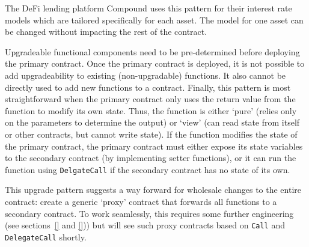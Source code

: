 The DeFi lending platform Compound uses this pattern for their interest rate models which are tailored specifically for each asset. The model for one asset can be changed without impacting the rest of the contract.

Upgradeable functional components need to be pre-determined before deploying the primary contract. Once the primary contract is deployed, it is not possible to add upgradeability to existing (non-upgradable) functions. It also cannot be directly used to add new functions to a contract. Finally, this pattern is most straightforward when the primary contract only uses the return value from the function to modify its own state. Thus, the function is either `pure' (relies only on the parameters to determine the output) or `view' (can read state from itself or other contracts, but cannot write state). If the function modifies the state of the primary contract, the primary contract must either expose its state variables to the secondary contract (by implementing setter functions), or it can run the function using \texttt{DelgateCall} if the secondary contract has no state of its own. 

This upgrade pattern suggests a way forward for wholesale changes to the entire contract: create a generic `proxy' contract that forwards all functions to a secondary contract. To work seamlessly, this requires some further engineering (see sections~\ref{} and \ref{})) but will see such proxy contracts based on \texttt{Call} and \texttt{DelegateCall} shortly.





